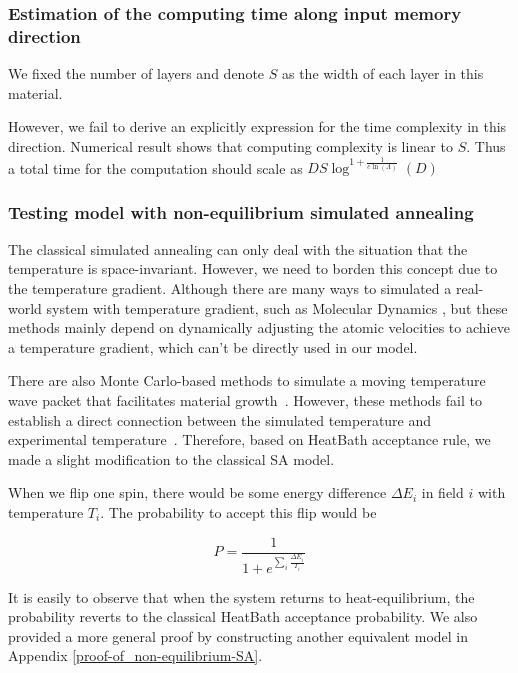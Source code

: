 \documentclass[twocolumn,superscriptaddress,english,showpacs,longbibliography]{revtex4-2}
\begin{document}
\subsubsection{Estimation of the computing time along input memory direction}\label{Estimation-of-the-computing-time-along-input-memory-direction}

We fixed the number of layers and denote $S$ as the width of each layer in this material.

However, we fail to derive an explicitly expression for the time complexity in this direction. 
Numerical result shows that computing complexity is linear to $S$. Thus a total time
for the computation should scale as $DS\log^{1 + \frac{1}{c\ln(\Lambda)}}(D)$ 

\subsubsection{Testing model with non-equilibrium simulated
annealing}\label{some-details-about-non-equilibrium-simulated-annealing}

The classical simulated annealing can only deal with the situation that
the temperature is space-invariant. However, we need to borden this concept
due to the temperature gradient. Although there are many ways to
simulated a real-world system with temperature gradient, such as
Molecular Dynamics \cite{Bai2015, Deng2006}, but
these methods mainly depend on dynamically adjusting the atomic
velocities to achieve a temperature gradient, which can't be directly
used in our model.

There are also Monte Carlo-based methods to simulate a moving
temperature wave packet that facilitates material growth~\cite{Godfrey1995, Tan2017}.
However, these methods fail to establish a direct connection between the simulated temperature and experimental
temperature~\cite{Zollner2014}.
Therefore, based on HeatBath acceptance rule, we made a slight modification to the classical SA model.

When we flip one spin, there would be some energy difference
$\Delta E_{i}$ in field $i$ with temperature $T_i$. The
probability to accept this flip would be

\begin{equation}
    \label{eq:non-equilibrium-SA}
P = \frac{1}{1 + e^{\sum_i \frac{\Delta E_i}{T_i}}}
\end{equation}

It is easily to observe that when the system returns to
heat-equilibrium, the probability reverts to the classical HeatBath
acceptance probability. We also provided a more general proof by constructing another equivalent model in Appendix \ref{proof-of_non-equilibrium-SA}.
\end{document}
